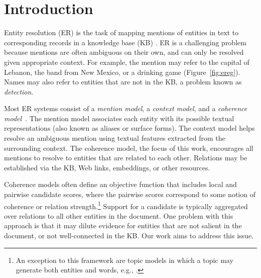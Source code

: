 \section{Introduction}
\label{sec:intro}

Entity resolution (ER) is the task of mapping mentions of entities in
text to corresponding records in a knowledge base (KB)
\cite{BunescuP06,Cucerzan07,KulkarniSRC09,Dredze2010,Hoffart2011,Hachey2013130}.
ER is a challenging problem because mentions are often ambiguous on
their own, and can only be resolved given appropriate context.  For
example, the mention  may refer to the capital of
Lebanon, the band from New Mexico, or a drinking game
(Figure~\ref{fig:ereg}).
Names may also refer to entities that are not in the KB, a problem
 known as \emph{{\NIL} detection}.

Most ER systems consist of a \emph{mention model}, a \emph{context
  model}, and a \emph{coherence
  model}~\cite{Milne2008,Cucerzan07,Ratinov11,Hoffart2011,Hachey2013130}.
The mention model associates each entity with its possible textual
representations (also known as aliases or surface forms).  The context
model helps resolve an ambiguous mention using textual features
extracted from the surrounding context. 
The coherence model, the focus of this work, encourages all mentions to resolve to
entities that are related to each other.  Relations may be established
via the KB, Web links, embeddings, or other resources.

Coherence models often define an objective function that includes
local and pairwise candidate scores, where the pairwise scores
correspond to some notion of coherence or relation
strength.\footnote{An exception to this framework are topic models in
  which a topic may generate both entities and words, e.g.,
  \cite{kataria2011,HanS12,houlsby2014scalable}.} 
  Support for a candidate is typically aggregated over
relations to all other entities in the document. One problem with this approach is that it may
dilute evidence for entities that are not salient in the document, or
not well-connected in the KB. Our work aims to address this issue.

